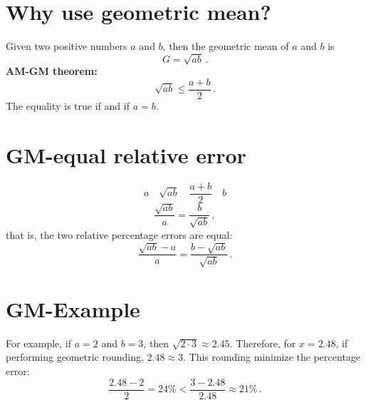 \documentclass[
  letterpaper,
  DIV=11,
  numbers=noendperiod]{scrreprt}
\begin{document}
\section{Why use geometric mean?}\label{why-use-geometric-mean}

Given two positive numbers \(a\) and \(b\), then the geometric mean of
\(a\) and \(b\) is \[
G=\sqrt{ab}\,.
\] \textbf{AM-GM theorem:} \[
\sqrt{ab}\le \frac{a+b}{2}\,.
\] The equality is true if and if \(a=b\).

\section{GM-equal relative error}\label{gm-equal-relative-error}

\[
a \quad \sqrt{ab} \quad \frac{a+b}{2}\quad b
\] \[
\frac{\sqrt{ab}}{a}=\frac{b}{\sqrt{ab}}\,,
\] that is, the two relative percentage errors are equal: \[
\frac{\sqrt{ab}-a}{a}=\frac{b-\sqrt{ab}}{\sqrt{ab}}\,.
\]

\section{GM-Example}\label{gm-example}

For example, if \(a=2\) and \(b=3\), then
\(\sqrt{2\cdot 3} \approx 2.45\). Therefore, for \(x=2.48\), if
performing geometric rounding, \(2.48\approx 3\). This rounding minimize
the percentage error: \[
\frac{2.48-2}{2}=24\% < \frac{3-2.48}{2.48}\approx 21\% \,.
\]
\end{document}
